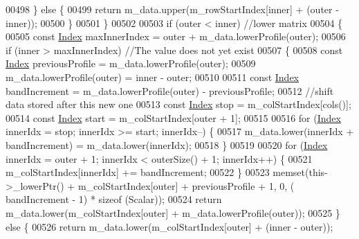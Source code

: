 \begin{DoxyCode}
00498                 \} \textcolor{keywordflow}{else} \{
00499                     \textcolor{keywordflow}{return} m\_data.upper(m\_rowStartIndex[inner] + (outer - inner));
00500                 \}
00501             \}
00502 
00503             \textcolor{keywordflow}{if} (outer < inner) \textcolor{comment}{//lower matrix}
00504             \{
00505                 \textcolor{keyword}{const} \hyperlink{group___core___module_a554f30542cc2316add4b1ea0a492ff02}{Index} maxInnerIndex = outer + m\_data.lowerProfile(outer);
00506                 \textcolor{keywordflow}{if} (inner > maxInnerIndex) \textcolor{comment}{//The value does not yet exist}
00507                 \{
00508                     \textcolor{keyword}{const} \hyperlink{group___core___module_a554f30542cc2316add4b1ea0a492ff02}{Index} previousProfile = m\_data.lowerProfile(outer);
00509                     m\_data.lowerProfile(outer) = inner - outer;
00510 
00511                     \textcolor{keyword}{const} \hyperlink{group___core___module_a554f30542cc2316add4b1ea0a492ff02}{Index} bandIncrement = m\_data.lowerProfile(outer) - previousProfile;
00512                     \textcolor{comment}{//shift data stored after this new one}
00513                     \textcolor{keyword}{const} \hyperlink{group___core___module_a554f30542cc2316add4b1ea0a492ff02}{Index} stop = m\_colStartIndex[cols()];
00514                     \textcolor{keyword}{const} \hyperlink{group___core___module_a554f30542cc2316add4b1ea0a492ff02}{Index} start = m\_colStartIndex[outer + 1];
00515 
00516                     \textcolor{keywordflow}{for} (\hyperlink{group___core___module_a554f30542cc2316add4b1ea0a492ff02}{Index} innerIdx = stop; innerIdx >= start; innerIdx--) \{
00517                         m\_data.lower(innerIdx + bandIncrement) = m\_data.lower(innerIdx);
00518                     \}
00519 
00520                     \textcolor{keywordflow}{for} (\hyperlink{group___core___module_a554f30542cc2316add4b1ea0a492ff02}{Index} innerIdx = outer + 1; innerIdx < outerSize() + 1; innerIdx++) \{
00521                         m\_colStartIndex[innerIdx] += bandIncrement;
00522                     \}
00523                     memset(this->\_lowerPtr() + m\_colStartIndex[outer] + previousProfile + 1, 0, (
      bandIncrement - 1) * \textcolor{keyword}{sizeof} (Scalar));
00524                     \textcolor{keywordflow}{return} m\_data.lower(m\_colStartIndex[outer] + m\_data.lowerProfile(outer));
00525                 \} \textcolor{keywordflow}{else} \{
00526                     \textcolor{keywordflow}{return} m\_data.lower(m\_colStartIndex[outer] + (inner - outer));

\end{DoxyCode}
